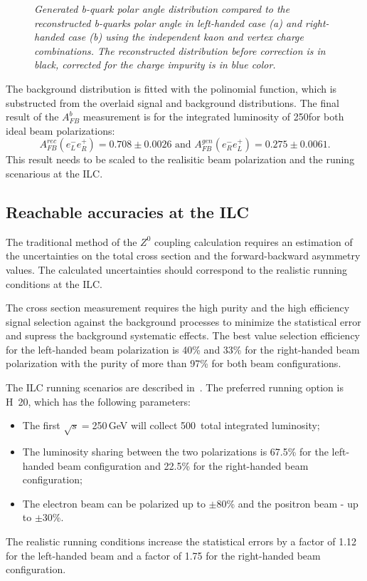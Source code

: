 \begin{figure}
\begin{subfigure}{0.5\textwidth}
		\caption{\label{fig:BAsymmetryFinal_b_3} }
	\end{subfigure}
	\caption{\sl Generated b-quark polar angle distribution compared to the reconstructed b-quarks polar angle in left-handed case (a) and right-handed case (b) using the independent kaon and vertex charge combinations. The reconstructed distribution before correction is in black, corrected for the charge impurity is in blue color. }
	\label{fig:BAsymmetryFinal_3}
\end{figure}
The background distribution is fitted with the polinomial function, which is substructed from the overlaid signal and background distributions. 
The final result of the $A_{FB}^b$ measurement is for the integrated luminosity of 250\ifb for both ideal beam polarizations:
\begin{equation}
A_{FB}^{rec}(e^-_L e^+_R) = 0.708\pm0.0026 \text{ and }A_{FB}^{gen}(e^-_R e^+_L) =  0.275\pm 0.0061.
\end{equation}
This result needs to be scaled to the realisitic beam polarization and the runing scenarious at the ILC.
\subsection{Reachable accuracies at the ILC}
The traditional method of the $Z^0$ coupling calculation requires an estimation of the uncertainties on the total cross section and the forward-backward asymmetry values. 
The calculated uncertainties should correspond to the realistic running conditions at the ILC.

The cross section measurement requires the high purity and the high efficiency signal selection against the background processes to minimize the statistical error and supress the background systematic effects. 
The best value selection efficiency for the left-handed beam polarization is 40\% and 33\% for the right-handed beam polarization with the purity of more than 97\% for both beam configurations. 


The ILC running scenarios are described in~\cite{bib:H20}. The  preferred running option is H~20, which has the following parameters:
\begin{itemize}
	\item The first $\sqrt{s}=$250\,GeV will collect 500\ifb\ total integrated luminosity;
	\item The luminosity sharing between the two polarizations is 67.5\% for the left-handed beam configuration and 22.5\% for the right-handed beam configuration;
	\item The electron beam can be polarized up to $\pm$80\% and the positron beam - up to $\pm$30\%.
\end{itemize}
The realistic running conditions increase the statistical errors by a factor of 1.12 for the left-handed beam and a factor of 1.75 for the right-handed beam configuration. 

